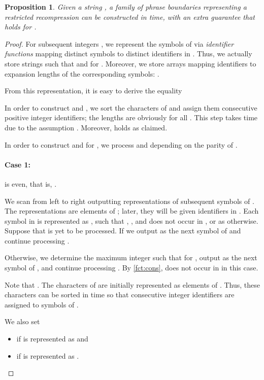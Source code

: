 \documentclass[a4paper]{article}
\newtheorem{proposition}[theorem]{Proposition}
\theoremstyle{definition}
\theoremstyle{remark}
\begin{document}
\begin{proposition}\label{lem:recompr2}
  Given a string , a family
  of phrase boundaries  representing a restricted recompression  can be constructed in  time,
  with an extra guarantee that  holds for .
\end{proposition}
\begin{proof}
For subsequent integers , we represent the symbols of  via \emph{identifier functions} 
mapping distinct symbols to distinct identifiers in .
Thus, we actually store strings  such that  and  for .
Moreover, we store arrays mapping identifiers to expansion lengths of 
the corresponding symbols: . 

From this representation, it is easy to derive the equality

In order to construct  and , we sort the characters of  and assign them consecutive positive integer identifiers;
the lengths are obviously  for all .
This step takes  time due to the assumption .
Moreover,  holds as claimed.

In order to construct  and  for , we process  and 
depending on the parity of .

\paragraph{Case 1:}  is even, that is, .

We scan  from left to right outputting representations of subsequent symbols of .
The representations are elements of ; later, they will be given identifiers in .
Each symbol  in  is represented as , such that , , and  does not occur in , or as  otherwise.
Suppose that  is yet to be processed.
If 
we output  as the next symbol of  and continue processing .

Otherwise, we determine the maximum integer  such that  for ,
output  as the next symbol of , and continue processing .
By \cref{fct:cons},  does not occur in  in this case.

Note that . The characters of  are initially represented as elements of . Thus, these characters can be sorted in  time so that consecutive integer identifiers  are assigned to symbols of . 

We also set 
\begin{itemize}
\item 
 if  is represented as  and 

\item  if  is represented as .
\end{itemize}


\end{proof}
\end{document}
